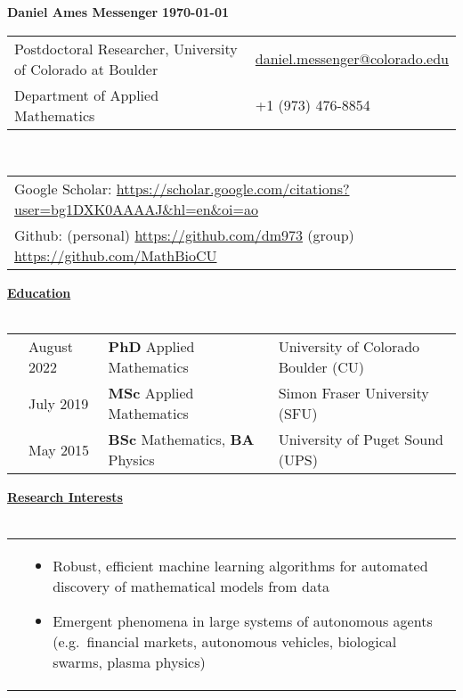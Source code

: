 \documentclass[letterpaper,11pt,oneside]{article}
\newcommand{\headr}[1]{\vspace{10pt}\uline{\Large{\textbf{#1}} \hfill } \\ \vspace{-10pt}\\}
\begin{document}
%
\noindent 
\LARGE{\textbf{Daniel Ames Messenger} \hspace{2in} \textbf{\monthyeardate\today}}   \\
\normalsize
%
%
\begin{center}
\begin{tabular}{l l}
 Postdoctoral Researcher, University of Colorado at Boulder & \hspace{0.5in} \href{mailto:daniel.messenger@colorado.edu}{daniel.messenger@colorado.edu} \\
Department of Applied Mathematics    & \hspace{1in}  +1 (973) 476-8854 \\
\end{tabular}\\ \vspace{0.5cm}
\begin{tabular}{l l}
Google Scholar: \url{https://scholar.google.com/citations?user=bg1DXK0AAAAJ&hl=en&oi=ao} & \\
Github: (personal) \url{https://github.com/dm973} \quad (group) \url{https://github.com/MathBioCU} &\\
\end{tabular}
\end{center}


\headr{Education}
 
\begin{tabular}{@{} p{0.01cm} p{4.2cm} p{5.5cm} p{8cm}}
& August 2022 & \textbf{PhD} Applied Mathematics & University of Colorado Boulder (CU)\\ 
&July 2019 & \textbf{MSc} Applied Mathematics & Simon Fraser University (SFU)\\ 
&May 2015  & \textbf{BSc} Mathematics, \textbf{BA} Physics & University of Puget Sound (UPS)\\
\end{tabular}

\headr{Research Interests}
%
\begin{tabular}{@{} p{0.01cm} p{15cm}}
&\begin{itemize}
\item Robust, efficient machine learning algorithms for automated discovery of mathematical models from data
\item Emergent phenomena in large systems of autonomous agents (e.g.\ financial markets, autonomous vehicles, biological swarms, plasma physics) 
\end{itemize}
\end{tabular}
\end{document}

